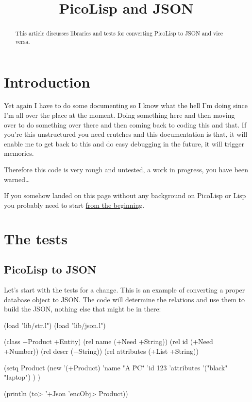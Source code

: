 \title{PicoLisp and JSON}

\maketitle


\begin{abstract}
This article discusses libraries and tests for converting PicoLisp to
JSON and vice versa.   
\end{abstract}

\section{Introduction}
\label{sec:pl-json-introduction}

Yet again I have to do some documenting so I know what the hell I'm
doing since I'm all over the place at the moment. Doing something here
and then moving over to do something over there and then coming back to
coding this and that. If you're this unstructured you need crutches and
this documentation is that, it will enable me to get back to this and do
easy debugging in the future, it will trigger memories.

Therefore this code is very rough and untested, a work in progress, you
have been warned\dots{}

If you somehow landed on this page without any background on PicoLisp
or Lisp you probably need to start
\href{http://www.prodevtips.com/2008/03/28/pico-lisp/}{from the beginning}.

\section{The tests}
\label{sec:pl-json-the-tests}

\subsection{PicoLisp to JSON}
\label{sec:pl-json-picolisp-to-json}

Let's start with the tests for a change. This is an example of
converting a proper database object to JSON. The code will determine the
relations and use them to build the JSON, nothing else that might be in
there:


\begin{wideverbatim}
(load "lib/str.l")
(load "lib/json.l")

(class +Product +Entity)
(rel name (+Need +String))
(rel id (+Need +Number))
(rel descr (+String))
(rel attributes (+List +String))

(setq Product
   (new '(+Product) 'name
      "A \"PC\"" 'id 123 'attributes '("black" "laptop") ) )

(println (to> '+Json 'encObj> Product))
\end{wideverbatim}

